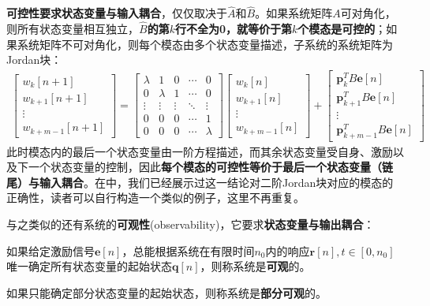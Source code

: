 \textbf{可控性要求状态变量与输入耦合}，仅仅取决于$\hat{A}$和$\hat{B}$。如果系统矩阵$A$可对角化，则所有状态变量相互独立，\textbf{$\hat{B}$的第$k$行不全为0，就等价于第$k$个模态是可控的}；如果系统矩阵不可对角化，则每个模态由多个状态变量描述，子系统的系统矩阵为Jordan块：
\begin{align*}
    \begin{bmatrix}
    w_k[n+1]\\
    w_{k+1}[n+1]\\
    \vdots\\
    w_{k+m-1}[n+1]
    \end{bmatrix}=\begin{bmatrix}
    \lambda & 1 & 0 & \cdots & 0\\
    0 & \lambda & 1 & \cdots & 0\\
    \vdots & \vdots & \vdots & \ddots & \vdots\\
    0 & 0 & 0 & \cdots & 1\\
    0 & 0 & 0 & \cdots & \lambda
    \end{bmatrix}\begin{bmatrix}
    w_k[n]\\
    w_{k+1}[n]\\
    \vdots\\
    w_{k+m-1}[n]
    \end{bmatrix}+\begin{bmatrix}
    \mathbf{p}_k^T B\mathbf{e}[n]\\
    \mathbf{p}_{k+1}^T B\mathbf{e}[n]\\
    \vdots\\
    \mathbf{p}_{k+m-1}^T B\mathbf{e}[n]
    \end{bmatrix}
\end{align*}
此时模态内的最后一个状态变量由一阶方程描述，而其余状态变量受自身、激励以及下一个状态变量的控制，因此\textbf{每个模态的可控性等价于最后一个状态变量（链尾）与输入耦合}。在中，我们已经展示过这一结论对二阶Jordan块对应的模态的正确性，读者可以自行构造一个类似的例子，这里不再重复。

与之类似的还有系统的\textbf{可观性}(observability)，它要求\textbf{状态变量与输出耦合}：

\begin{definition}[可观性]
    如果给定激励信号$\mathbf{e}[n]$，总能根据系统在有限时间$n_0$内的响应$\mathbf{r}[n],t\in[0,n_0]$唯一确定所有状态变量的起始状态$\mathbf{q}[n]$，则称系统是\textbf{可观}的。

    如果只能确定部分状态变量的起始状态，则称系统是\textbf{部分可观}的。
\end{definition}

